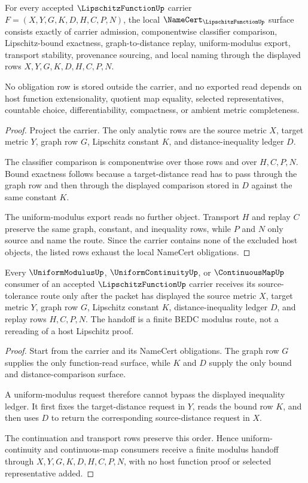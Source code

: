 \begin{theorem}
\label{thm:lipschitz-function-namecert-obligations}
For every accepted $\LipschitzFunctionUp$ carrier $F=(X,Y,G,K,D,H,C,P,N)$, the local $\NameCert_{\LipschitzFunctionUp}$ surface consists exactly of carrier admission, componentwise classifier comparison, Lipschitz-bound exactness, graph-to-distance replay, uniform-modulus export, transport stability, provenance sourcing, and local naming through the displayed rows $X,Y,G,K,D,H,C,P,N$.

No obligation row is stored outside the carrier, and no exported read depends on host function extensionality, quotient map equality, selected representatives, countable choice, differentiability, compactness, or ambient metric completeness.
\end{theorem}
\begin{proof}
Project the carrier. The only analytic rows are the source metric $X$, target metric $Y$, graph row $G$, Lipschitz constant $K$, and distance-inequality ledger $D$.

The classifier comparison is componentwise over those rows and over $H,C,P,N$. Bound exactness follows because a target-distance read has to pass through the graph row and then through the displayed comparison stored in $D$ against the same constant $K$.

The uniform-modulus export reads no further object. Transport $H$ and replay $C$ preserve the same graph, constant, and inequality rows, while $P$ and $N$ only source and name the route. Since the carrier contains none of the excluded host objects, the listed rows exhaust the local NameCert obligations.
\end{proof}

\begin{theorem}
\label{thm:lipschitz-function-uniform-continuity-handoff}
Every $\UniformModulusUp$, $\UniformContinuityUp$, or $\ContinuousMapUp$ consumer of an accepted $\LipschitzFunctionUp$ carrier receives its source-tolerance route only after the packet has displayed the source metric $X$, target metric $Y$, graph row $G$, Lipschitz constant $K$, distance-inequality ledger $D$, and replay rows $H,C,P,N$. The handoff is a finite BEDC modulus route, not a rereading of a host Lipschitz proof.
\end{theorem}
\begin{proof}
Start from the carrier and its NameCert obligations. The graph row $G$ supplies the only function-read surface, while $K$ and $D$ supply the only bound and distance-comparison surface.

A uniform-modulus request therefore cannot bypass the displayed inequality ledger. It first fixes the target-distance request in $Y$, reads the bound row $K$, and then uses $D$ to return the corresponding source-distance request in $X$.

The continuation and transport rows preserve this order. Hence uniform-continuity and continuous-map consumers receive a finite modulus handoff through $X,Y,G,K,D,H,C,P,N$, with no host function proof or selected representative added.
\end{proof}

